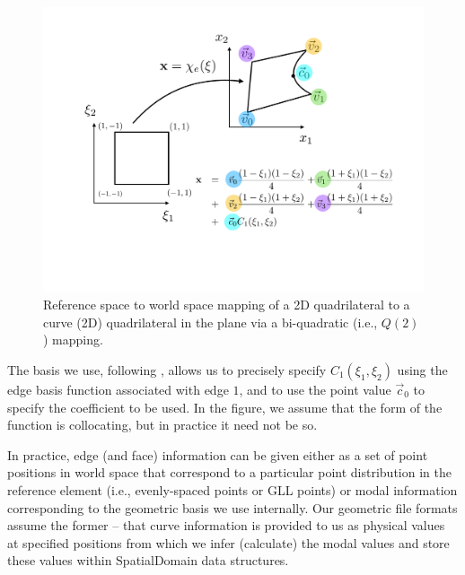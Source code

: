 \begin{figure}[htb]
\centering
\includegraphics[width=6in]{img/curvemap.pdf}
\caption{Reference space to world space mapping of a 2D quadrilateral to a curve (2D) quadrilateral in the plane via a bi-quadratic (i.e., $Q(2)$) mapping.}
\label{spatialdomains:curvemap}
\end{figure}

The basis we use, following \cite{KaSh05}, allows us to precisely specify $C_1(\xi_1,\xi_2)$ using the edge basis function associated with edge $1$, and
to use the point value $\vec{c}_0$ to specify the coefficient to be used.  In the figure, we assume that the form of the function is collocating, but in practice
it need not be so.  

In practice, edge (and face) information can be given either as a set of point positions in world space that correspond to a particular point distribution 
in the reference element (i.e., evenly-spaced points or GLL points) or modal information corresponding to the geometric basis we use internally.  Our
geometric file formats assume the former -- that curve information is provided to us as physical values at specified positions from which we infer (calculate)
the modal values and store these values within SpatialDomain data structures.

